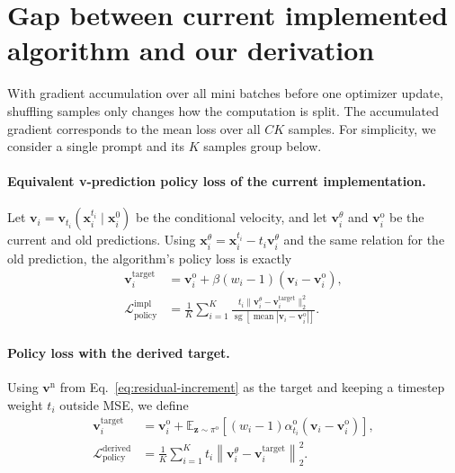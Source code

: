 \documentclass{article} %
\begin{document}
\section{Gap between current implemented algorithm and our derivation}

With gradient accumulation over all mini batches before one optimizer
update, shuffling samples only changes how the computation is split.
The accumulated gradient corresponds to the
mean loss over all $CK$ samples. For simplicity, we consider a single prompt and its
$K$ samples group below.



\paragraph{Equivalent v-prediction policy loss of the current implementation.}
Let $\mathbf v_i=\mathbf v_{t_i}(\mathbf x_i^{t_i}\mid\mathbf x_i^0)$
be the conditional velocity, and let $\mathbf v_i^\theta$ and
$\mathbf v_i^{\mathrm{o}}$ be the current and old predictions.
Using $\mathbf x_i^\theta=\mathbf x_i^{t_i}-t_i\mathbf v_i^\theta$
and the same relation for the old prediction, the algorithm's policy loss
is exactly
\begin{align}
\mathbf v_i^{\mathrm{target}}
&=\mathbf v_i^{\mathrm{o}}
+\beta(w_i-1)(\mathbf v_i-\mathbf v_i^{\mathrm{o}}),
\label{eq:implemented-v-target}\\
\mathcal L_{\mathrm{policy}}^{\mathrm{impl}}
&=\frac1K\sum_{i=1}^{K}
\frac{t_i\|\mathbf v_i^\theta
-\mathbf v_i^{\mathrm{target}}\|_2^2}
{\operatorname{sg}[\operatorname{mean}
|\mathbf v_i-\mathbf v_i^{\mathrm{o}}|]}.
\label{eq:implemented-v-loss}
\end{align}


\paragraph{Policy loss with the derived target.}
Using $\mathbf v^{\mathrm{n}}$ from Eq.~\eqref{eq:residual-increment}
as the target and keeping a timestep weight $t_i$ outside MSE, we define
\begin{equation}
\boxed{
\begin{aligned}
\mathbf v_i^{\mathrm{target}}
&=\mathbf v^{\mathrm{o}}_i
+\mathbb E_{\mathbf z\sim\pi^{\mathrm{o}}}
 [(w_i-1)\alpha_{t_i}^{\mathrm{o}}(\mathbf v_i-\mathbf v^{\mathrm{o}}_i)],\\
\mathcal L_{\mathrm{policy}}^{\mathrm{derived}}
&=\frac1K\sum_{i=1}^{K}t_i
\left\|\mathbf v_i^\theta
-\mathbf v_i^{\mathrm{target}}\right\|_2^2.
\end{aligned}
}
\label{eq:derived-policy-loss}
\end{equation}
\end{document}
